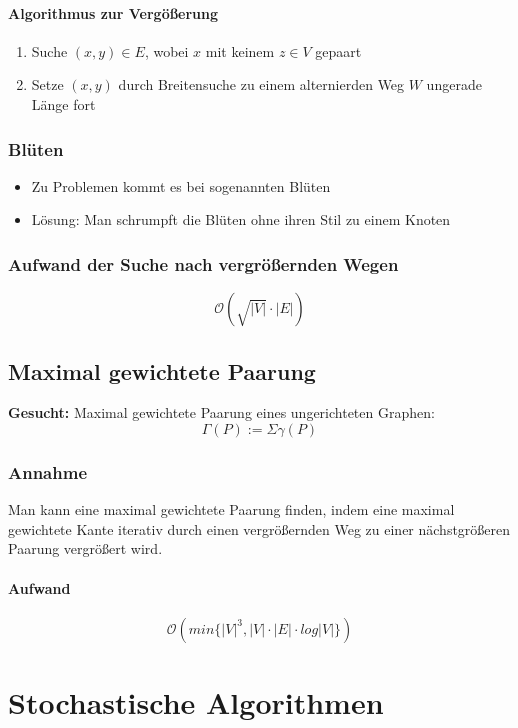 \paragraph{Algorithmus zur Vergößerung}
\begin{enumerate}
	\item Suche \((x,y) \in E\), wobei \(x\) mit keinem \(z\in V\) gepaart
	\item Setze \((x,y)\) durch Breitensuche zu einem alternierden Weg \(W\) ungerade Länge fort
\end{enumerate}


\subsubsection{Blüten}
\begin{itemize}
	\item Zu Problemen kommt es bei sogenannten Blüten
	\item Lösung: Man schrumpft die Blüten ohne ihren Stil zu einem Knoten
\end{itemize}

\subsubsection{Aufwand der Suche nach vergrößernden Wegen}
\[\mathcal{O}(\sqrt{|V|} \cdot |E|)\]


\subsection{Maximal gewichtete Paarung}
\textbf{Gesucht:} Maximal gewichtete Paarung eines ungerichteten Graphen:
\[\Gamma(P) := \Sigma \gamma (P)\]

\subsubsection{Annahme}
Man kann eine maximal gewichtete Paarung finden, indem eine maximal gewichtete Kante iterativ durch einen vergrößernden Weg zu einer nächstgrößeren Paarung vergrößert wird.

\paragraph{Aufwand}
\[\mathcal{O}(min\{|V|^3, |V| \cdot |E| \cdot log|V|\})\]



\section{Stochastische Algorithmen}

